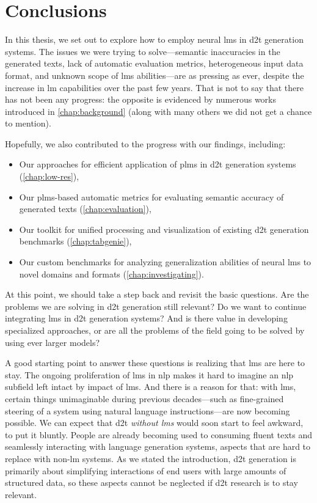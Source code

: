 
\chapter{Conclusions}
\label{chap:conclusions}

In this thesis, we set out to explore how to employ neural \acp{lm} in \ac{d2t} generation systems. The issues we were trying to solve---semantic inaccuracies in the generated texts, lack of automatic evaluation metrics, heterogeneous input data format, and unknown scope of \acp{lm} abilities---are as pressing as ever, despite the increase in \ac{lm} capabilities over the past few years. That is not to say that there has not been any progress: the opposite is evidenced by numerous works introduced in \autoref{chap:background} (along with many others we did not get a chance to mention).


Hopefully, we also contributed to the progress with our findings, including:
\begin{itemize}
    \item Our approaches for efficient application of \acp{plm} in \ac{d2t} generation systems (\autoref{chap:low-res}),
    \item Our \acp{plm}-based automatic metrics for evaluating semantic accuracy of generated texts (\autoref{chap:evaluation}),
    \item Our toolkit for unified processing and visualization of existing \ac{d2t} generation benchmarks (\autoref{chap:tabgenie}),
    \item Our custom benchmarks for analyzing generalization abilities of neural \acp{lm} to novel domains and formats (\autoref{chap:investigating}).
\end{itemize}

At this point, we should take a step back and revisit the basic questions. Are the problems we are solving in \ac{d2t} generation still relevant? Do we want to continue integrating \acp{lm} in \ac{d2t} generation systems? And is there value in developing specialized approaches, or are all the problems of the field going to be solved by using ever larger models?

A good starting point to answer these questions is realizing that \acp{lm} are here to stay. The ongoing proliferation of \acp{lm} in \ac{nlp} makes it hard to imagine an \ac{nlp} subfield left intact by impact of \acp{lm}. And there is a reason for that: with \acp{lm}, certain things unimaginable during previous decades---such as fine-grained steering of a system using natural language instructions---are now becoming possible. We can expect that \ac{d2t} \emph{without \acp{lm}} would soon start to feel awkward, to put it bluntly. People are already becoming used to consuming fluent texts and seamlessly interacting with language generation systems, aspects that are hard to replace with non-\ac{lm} systems. As we stated the introduction, \ac{d2t} generation is primarily about simplifying interactions of end users with large amounts of structured data, so these aspects cannot be neglected if \ac{d2t} research is to stay relevant.

